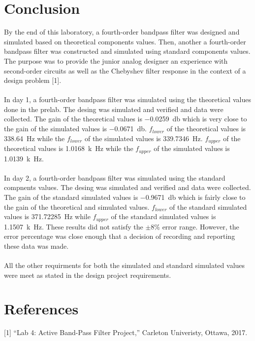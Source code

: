 \documentclass[hidelinks]{article}
\begin{document}
	\section{Conclusion}
	By the end of this laboratory, a fourth-order bandpass filter was designed and simulated based on theoretical components values.
	Then, another a fourth-order bandpass filter was constructed and simulated using standard components values.
	The purpose was to provide the junior analog designer an experience with second-order circuits as well as the Chebyshev filter response in the context of a design problem [1].\\\\
	In day 1, a fourth-order bandpass filter was simulated using the theoretical values done in the prelab.
	The desing was simulated and verified and data were collected.
	The gain of the theoretical values is \SI{-0.0259}{\decibel} which is very close to the gain of the simulated values is \SI{-0.0671}{\decibel}.
	$f_{lower}$ of the theoretical values is \SI{338.64}{\hertz} while the $f_{lower}$ of the simulated values is \SI{339.7346}{\hertz}.
	$f_{upper}$ of the theoretical values is \SI{1.0168}{k\hertz} while the $f_{upper}$ of the simulated values is \SI{1.0139}{k\hertz}.\\\\
	In day 2, a fourth-order bandpass filter was simulated using the standard compnents values.
	The desing was simulated and verified and data were collected.
	The gain of the standard simulated values is \SI{-0.9671}{\decibel} which is fairly close to the gain of the theoretical and simulated values.
	$f_{lower}$ of the standard simulated values is \SI{371.72285}{\hertz} while $f_{upper}$ of the standard simulated values is \SI{1.1507}{k\hertz}.
	These results did not satisfy the $\pm$8\% error range. 
	However, the error percentage was close enough that a decision of recording and reporting these data was made.\\\\
	All the other requirments for both the simulated and standard simulated values were meet as stated in the design project requirements.
	
	\pagebreak
	\section{References}
	[1] “Lab 4: Active Band-Pass Filter Project,” Carleton Univeristy, Ottawa, 2017.
	
	\pagebreak
\end{document}
